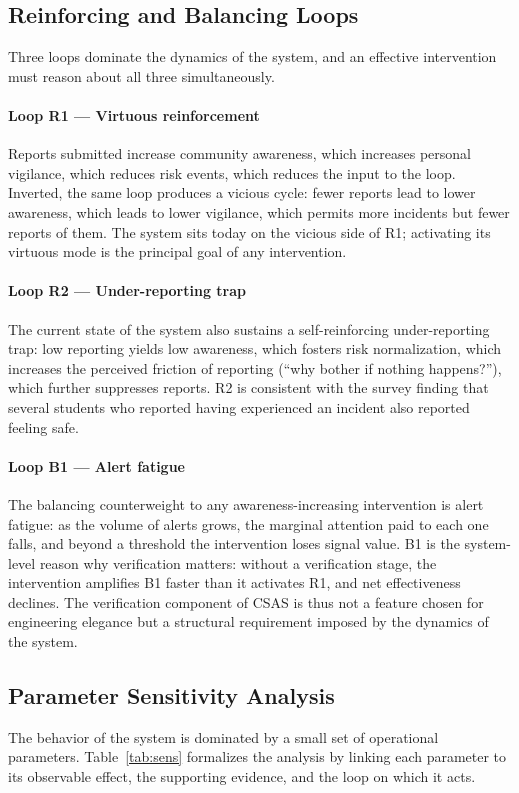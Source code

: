 \documentclass[conference]{IEEEtran}
\begin{document}
\subsection{Reinforcing and Balancing Loops}
\label{sec:loops}
Three loops dominate the dynamics of the system, and an effective
intervention must reason about all three simultaneously.

\paragraph{Loop R1 --- Virtuous reinforcement}
Reports submitted increase community awareness, which increases
personal vigilance, which reduces risk events, which reduces the
input to the loop. Inverted, the same loop produces a vicious cycle:
fewer reports lead to lower awareness, which leads to lower vigilance,
which permits more incidents but fewer reports of them. The system
sits today on the vicious side of R1; activating its virtuous mode is
the principal goal of any intervention.

\paragraph{Loop R2 --- Under-reporting trap}
The current state of the system also sustains a self-reinforcing
under-reporting trap: low reporting yields low awareness, which
fosters risk normalization, which increases the perceived friction of
reporting (``why bother if nothing happens?''), which further
suppresses reports. R2 is consistent with the survey finding that
several students who reported having experienced an incident also
reported feeling safe.

\paragraph{Loop B1 --- Alert fatigue}
The balancing counterweight to any awareness-increasing intervention
is alert fatigue: as the volume of alerts grows, the marginal
attention paid to each one falls, and beyond a threshold the
intervention loses signal value. B1 is the system-level reason why
verification matters: without a verification stage, the intervention
amplifies B1 faster than it activates R1, and net effectiveness
declines. The verification component of CSAS is thus not a feature
chosen for engineering elegance but a structural requirement imposed
by the dynamics of the system.

\subsection{Parameter Sensitivity Analysis}
The behavior of the system is dominated by a small set of operational
parameters. Table~\ref{tab:sens} formalizes the analysis by linking
each parameter to its observable effect, the supporting evidence, and
the loop on which it acts.
\end{document}
